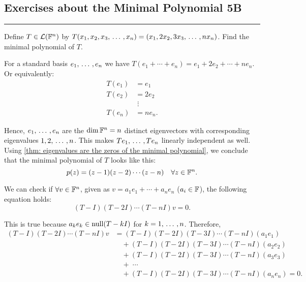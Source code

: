 \subsection*{Exercises about the Minimal Polynomial 5B}
\hrule
\phantom{.}

\begin{xrcs}
  Define $T \in \mathcal{L}(\mathbb{F}^n)$ by $T(x_1, x_2, x_3, {\, \ldots \,\,}, x_n) = (x_1, 2 x_2, 3 x_3, {\, \ldots \,\,},  n x_n)$. Find the minimal polynomial of $T$.

  \begin{xsol}
    For a standard basis $e_1, {\, \ldots \,\,}, e_n$ we have $T( e_1 + \cdots + e_n) = e_1 + 2e_2 + \cdots + n e_n$. Or equivalently:
    \begin{equation}
      \begin{aligned}
        T(e_1) &= e_1  \\
        T(e_2) &= 2e_2 \\
               &\; \vdots \\
        T(e_n) &= n e_n.
      \end{aligned}
    \end{equation}

    Hence, $e_1, {\, \ldots \,\,}, e_n$ are the $\dim \mathbb{F}^n = n$ distinct eigenvectors with corresponding eigenvalues $1, 2,  {\, \ldots \,\,}, n$. This makes $Te_1, {\, \ldots \,\,}, Te_n$ linearly independent as well. Using \ref{thm: eigenvalues are the zeros of the minimal polynomial}, we conclude that the minimal polynomial of $T$ looks like this:
    \begin{equation}
      \label{eq: minmal polynomial of T(x_1, x_2, x_3, ..., x_n) = (x_1, 2 x_2, 3 x_3, ...,  n x_n)}
      p(z) = (z-1)(z-2)\cdots(z-n) \quad \forall z \in \mathbb{F}^n.
    \end{equation}

    We can check if $\forall v \in \mathbb{F}^n$, given as $v = a_1 e_1 + \cdots + a_n e_n$ ($a_i \in \mathbb{F}$), the following equation holds:
    \begin{equation}
      (T-I)(T-2I)\cdots(T-nI)v=0.
    \end{equation}

    This is true because $a_k e_k \in \operatorname{null} (T-kI)$ for $k=1, {\, \ldots \,\,}, n$. Therefore,
    \begin{equation}
      \begin{aligned}
          (T-I)(T-2I)\cdots(T-nI)v & = (T-I)(T-2I)(T-3I)\cdots(T-nI)(a_1 e_1) \\
                                 & \quad + (T-I)(T-2I)(T-3I)\cdots(T-nI)(a_2 e_2) \\
                                 & \quad + (T-I)(T-2I)(T-3I)\cdots(T-nI)(a_3 e_3) \\
                                 & \quad + \; \cdots \\
                                 & \quad + (T-I)(T-2I)(T-3I)\cdots(T-nI)(a_n e_n) = 0.
      \end{aligned}
    \end{equation}


\end{xsol}
\end{xrcs}
